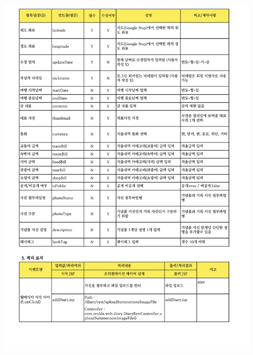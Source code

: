 {{{{{{{{{{{{{{{{{{{{{{{{{{{{{\includegraphics[width=20cm]{./Figure/Design/Display/diary/diary_11.pdf} \\
}}}}}}}}}}}}}}}}}}}}}}}}}}}}}
